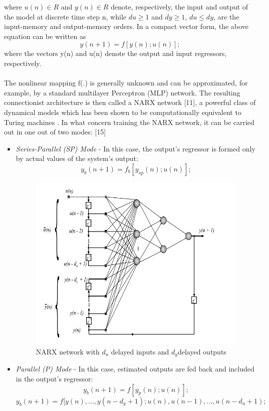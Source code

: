 \documentclass[12pt,a4paper]{report}
\begin{document}
where $u(n) \in R$ and $y(n)\in R$ denote, respectively, the input and output of the model at discrete time step n, while $du  \geq 1$ and $dy \geq 1$, $du \leq dy$, are the
input-memory and output-memory orders. In a compact vector form,  
the above equation can be written as
$$y(n + 1) = f[y(n); u(n)]; $$
where the vectors y(n) and u(n) denote the output and input regressors, respectively.
\paragraph{} 
The nonlinear mapping f(.) is generally unknown and can be approximated,
for example, by a standard multilayer Perceptron (MLP) network. The resulting connectionist architecture is then called a NARX network [11], a powerful class of dynamical models which has been shown to be computationally equivalent to Turing machines . In what concern training the NARX
network, it can be carried out in one out of two modes: [15]

\begin{itemize}
\item \textit{Series-Parallel (SP) Mode} - In this case, the output's regressor is formed
only by actual values of the system's output:
$$y_b(n + 1)=f_b[y_{sp}(n); u(n)];$$
\begin{figure}[h!]
	\centering
		\includegraphics[scale=0.8]{screenshots/sp_nn.png}
		\caption{NARX network with $d_u$ delayed inputs and $d_y $delayed outputs}
\end{figure}
\item \textit{Parallel (P) Mode} - In this case, estimated outputs are fed back and
included in the output's regressor:
$$y_b(n + 1)=f[y_p(n); u(n)];$$
$$y_b(n + 1)=f[y(n),...,y(n-d_y + 1); u(n),u(n-1),..., u(n-d_u+1);$$
\end{itemize}
\end{document}
